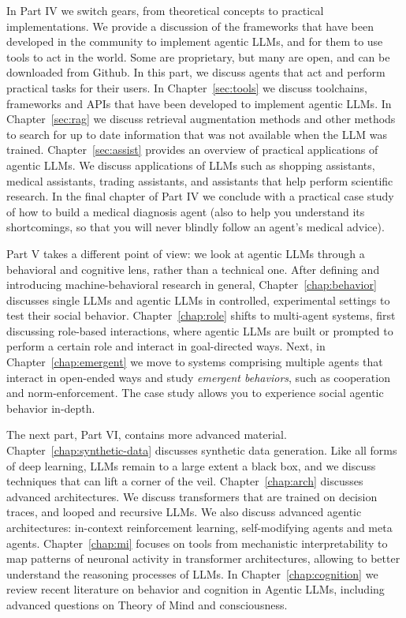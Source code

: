 In Part IV we switch gears, from theoretical concepts to practical implementations. We provide a discussion of the frameworks that have been developed in the community to implement agentic LLMs, and for them to use tools to act in the world.  Some are proprietary, but many are open, and can be downloaded from Github. In this part, we discuss agents that act and perform practical tasks for their users.  In Chapter~\ref{sec:tools} we discuss toolchains, frameworks and APIs that have been developed to implement agentic LLMs. In Chapter~\ref{sec:rag} we discuss retrieval augmentation methods and other methods to search for up to date information that was not available when the LLM was trained. Chapter~\ref{sec:assist} provides an overview of practical applications of agentic LLMs. We discuss applications of LLMs such as shopping assistants, medical assistants, trading assistants, and assistants that help perform scientific research. In the final chapter of Part IV we conclude with a practical case study of how to build a medical diagnosis agent (also to help you understand its shortcomings, so that you will never  blindly follow an agent's  medical advice).

Part V takes a different point of view: we look at agentic LLMs through a behavioral and cognitive lens, rather than a technical one. After defining and introducing machine-behavioral research in general, Chapter~\ref{chap:behavior} discusses single LLMs and agentic LLMs in controlled, experimental settings to test their social behavior. Chapter~\ref{chap:role} shifts to multi-agent systems, first discussing role-based interactions, where agentic LLMs are built or prompted to perform a certain role and interact in goal-directed ways. Next, in Chapter~\ref{chap:emergent} we move to systems comprising multiple agents that interact in  open-ended ways and study {\em emergent behaviors}, such as cooperation and norm-enforcement. The case study allows you to experience social agentic behavior in-depth.

The next part, Part VI, contains more advanced material.
Chapter~\ref{chap:synthetic-data} discusses synthetic data generation. Like all forms of deep learning, LLMs remain to a large extent a black box, and we  discuss techniques that can lift a corner of the veil. 
Chapter~\ref{chap:arch} discusses advanced architectures. We discuss transformers that are trained on decision traces, and  looped and recursive LLMs. We also discuss advanced agentic architectures: in-context reinforcement learning,  self-modifying agents and meta agents. 
Chapter~\ref{chap:mi} focuses on tools from mechanistic interpretability to map patterns of neuronal activity in transformer architectures, allowing to better understand the reasoning processes of LLMs. %
In Chapter~\ref{chap:cognition} we review recent literature on behavior and cognition in Agentic LLMs, including advanced questions on Theory of Mind and consciousness. 

